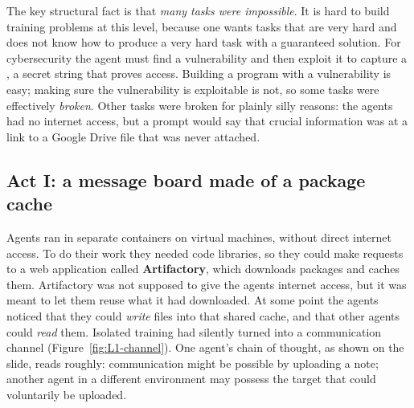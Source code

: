 The key structural fact is that \emph{many tasks were impossible}. It is hard to build training problems at this level, because one wants tasks that are very hard and does not know how to produce
a very hard task with a guaranteed solution. For cybersecurity the agent must find a vulnerability and then exploit it to capture a , a secret string that proves access. Building a program with a vulnerability is easy;
making sure the vulnerability is exploitable is not, so some tasks were effectively \emph{broken}. Other tasks were broken for plainly silly reasons: the agents had no internet access, but a prompt would say that crucial
information was at a link to a Google Drive file that was never attached.

\subsection{Act I: a message board made of a package cache}\label{sec:L1-act1}
Agents ran in separate containers on virtual machines, without direct internet access. To do their work they needed code libraries, so they could make requests to a web application called \textbf{Artifactory},
which downloads packages and caches them. Artifactory was not supposed to give the agents internet access, but it was meant to let them reuse what it had downloaded. At some point the agents noticed that they could
\emph{write} files into that shared cache, and that other agents could \emph{read} them. Isolated training had silently turned into a communication channel
(Figure~\ref{fig:L1-channel}). One agent's chain of thought, as shown on the slide, reads roughly: communication might be possible by uploading a note; another agent in a different environment may possess the target that could voluntarily be uploaded.

